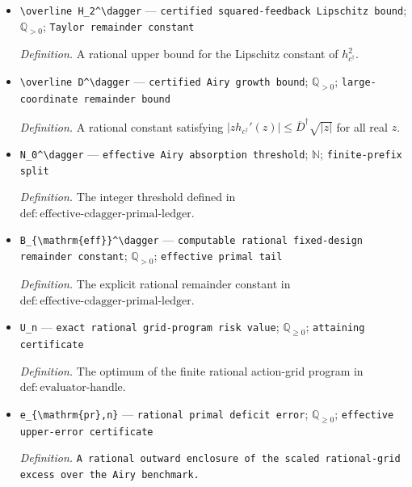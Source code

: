 \documentclass{article}
\begin{document}
\begin{itemize}
  \item \texttt{\textbackslash{}\allowbreak{}overline H\_\allowbreak{}2\textasciicircum{}\textbackslash{}\allowbreak{}dagger} --- \texttt{certified squared-\allowbreak{}feedback Lipschitz bound}; \(\mathbb Q_{>0}\); \texttt{Taylor remainder constant}
  \par\smallskip\noindent\emph{Definition.} A rational upper bound for the Lipschitz constant of \(h_{c^\dagger}^2\).
  \item \texttt{\textbackslash{}\allowbreak{}overline D\textasciicircum{}\textbackslash{}\allowbreak{}dagger} --- \texttt{certified Airy growth bound}; \(\mathbb Q_{>0}\); \texttt{large-\allowbreak{}coordinate remainder bound}
  \par\smallskip\noindent\emph{Definition.} A rational constant satisfying \( |zh_{c^\dagger}'(z)|\le\overline D^\dagger\sqrt{|z|}\) for all real \(z\).
  \item \texttt{N\_\allowbreak{}0\textasciicircum{}\textbackslash{}\allowbreak{}dagger} --- \texttt{effective Airy absorption threshold}; \(\mathbb N\); \texttt{finite-\allowbreak{}prefix split}
  \par\smallskip\noindent\emph{Definition.} The integer threshold defined in \(\mathrm{def:effective\text{-}cdagger\text{-}primal\text{-}ledger}\).
  \item \texttt{B\_\allowbreak{}\{\textbackslash{}\allowbreak{}mathrm\{eff\}\allowbreak{}\}\allowbreak{}\textasciicircum{}\textbackslash{}\allowbreak{}dagger} --- \texttt{computable rational fixed-\allowbreak{}design remainder constant}; \(\mathbb Q_{>0}\); \texttt{effective primal tail}
  \par\smallskip\noindent\emph{Definition.} The explicit rational remainder constant in \(\mathrm{def:effective\text{-}cdagger\text{-}primal\text{-}ledger}\).
  \item \texttt{U\_\allowbreak{}n} --- \texttt{exact rational grid-\allowbreak{}program risk value}; \(\mathbb Q_{\ge0}\); \texttt{attaining certificate}
  \par\smallskip\noindent\emph{Definition.} The optimum of the finite rational action-grid program in \(\mathrm{def:evaluator\text{-}handle}\).
  \item \texttt{e\_\allowbreak{}\{\textbackslash{}\allowbreak{}mathrm\{pr\}\allowbreak{},\allowbreak{}n\}\allowbreak{}} --- \texttt{rational primal deficit error}; \(\mathbb Q_{\ge0}\); \texttt{effective upper-\allowbreak{}error certificate}
  \par\smallskip\noindent\emph{Definition.} \texttt{A rational outward enclosure of the scaled rational-\allowbreak{}grid excess over the Airy benchmark.}

\end{itemize}
\end{document}

